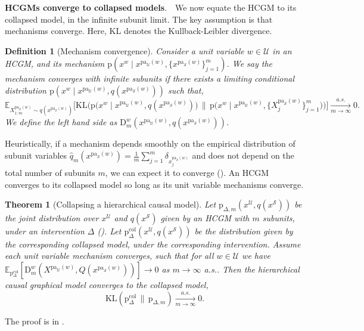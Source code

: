 \documentclass[12pt]{article}
\newtheorem{theorem}{Theorem}
\newtheorem{definition}{Definition}
\newcommand{\pa}{\mathrm{pa}}
\newcommand{\pr}{\mathrm{p}}
\newcommand{\col}{\mathrm{col}}
\newcommand{\parhead}[1]{\vspace{0.1in} \noindent \textbf{#1}. \,\,}
\begin{document}
\parhead{HCGMs converge to collapsed models} We now equate the HCGM to its collapsed model, in the infinite subunit limit. The key assumption is that mechanisms converge. Here, KL denotes the Kullback-Leibler divergence.
\begin{definition}[Mechanism convergence] \label{asm:inf-subunit}
  Consider a unit variable $w \in \mathcal{U}$ in an HCGM, and its
  mechanism
  $\pr(x^w \mid x^{\pa_\mathcal{U}(w)},
  \{x^{\pa_{\mathcal{S}}(w)}\}_{j=1}^m)$.  We say the mechanism
  converges with infinite subunits if there exists a limiting
  conditional distribution
  $\pr(x^{w} \mid x^{\pa_\mathcal{U}(w)}, q(x^{\pa_\mathcal{S}(w)}))$
  such that,
\begin{equation}
  \mathbb{E}_{X_{1:m}^{\pa_\mathcal{S}(w)}\sim q(x^{\pa_\mathcal{S}(w)})}\Big[\mathrm{KL}\Big(\pr\big(x^{w} \mid x^{\pa_\mathcal{U}(w)}, q(x^{\pa_\mathcal{S}(w)})\big)\, \big\| \, \pr\big(x^w \mid x^{\pa_\mathcal{U}(w)}, \{X_{j}^{\pa_\mathcal{S}(w)}\}_{j =1}^m\big)\Big)\Big] \xrightarrow[m\to\infty]{a.s.} 0.
\end{equation}
We define the left hand side as $\mathrm{D}^{w}_m(x^{\pa_\mathcal{U}(w)}, q(x^{\pa_\mathcal{S}(w)}))$.
\end{definition}
\noindent 
Heuristically, if a mechanism depends smoothly on the empirical distribution of subunit variables $\hat{q}_m(x^{\pa_\mathcal{S}(w)}) = \frac{1}{m} \sum_{j=1}^m \delta_{x_j^{\pa_\mathcal{S}(w)}}$ and does not depend on the total number of subunits $m$, we can expect it to converge
().
An HCGM converges to its collapsed model so long as its unit variable mechanisms converge.
\begin{theorem}[Collapsing a hierarchical causal model] \label{thm:valid_collapse}
Let $\pr_{\Delta,m}(x^{\mathcal{U}},q(x^{\mathcal{S}}))$ be the joint distribution over $x^{\mathcal{U}}$ and $q(x^{\mathcal{S}})$ given by an HCGM with $m$ subunits, under an intervention $\Delta$ (). Let $\pr^{\col}_\Delta(x^{\mathcal{U}}, q(x^{\mathcal{S}}))$ be the distribution given by the corresponding collapsed model, under the corresponding intervention.
Assume each unit variable mechanism converges, such that for all $w \in \mathcal{U}$ we have $\mathbb{E}_{\pr^\col_\Delta}[\mathrm{D}^w_m(X^{\pa_\mathcal{U}(w)}, Q(x^{\pa_\mathcal{S}(w)}))] \to 0$ as $m \to \infty$ a.s..
Then the hierarchical causal graphical model converges to the collapsed model,
\begin{equation}
        \mathrm{KL}(\pr_\Delta^{\col} \, \|\, \pr_{\Delta,m}) \xrightarrow[m\to\infty]{a.s.} 0.
\end{equation}
\end{theorem}
\noindent The proof is in .
\end{document}

